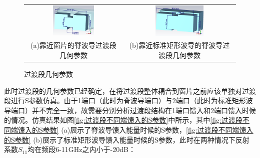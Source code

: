 \documentclass[master]{thesis-uestc}
\begin{document}
\begin{figure}[!htb]
    \small
    \centering
    \begin{tabular}{@{\ }c@{\ }c}
        \includegraphics[width=0.45\textwidth]{pic/chapter3/靠近窗片的脊波导过渡段.png} & 
        \hspace{5pt}
        \includegraphics[width=0.45\textwidth]{pic/chapter3/靠近标准矩形波导的脊波导过渡段.png}     \\
        \mbox{\small (a)靠近窗片的脊波导过渡段几何参数}                                                                               & 
        \mbox{\small (b)靠近标准矩形波导的脊波导过渡段几何参数}                                                                                  \\
    \end{tabular}
    \caption{过渡段几何参数}
    \label{fig:过渡段几何参数}
\end{figure}

此时过渡段的几何参数已经确定，在将过渡段整体耦合到窗片之前应该单独对过渡段进行S参数仿真。由于1端口（此时为脊波导端口）与2端口（此时为标准矩形波导端口）并不完全一致，故需要分别分析过渡段结构在1端口馈入和2端口馈入时候的情况。仿真结果如图\ref{fig:过渡段不同端馈入的S参数}中所示，其中\ref{fig:过渡段不同端馈入的S参数} (a)展示了脊波导馈入能量时候的S参数，\ref{fig:过渡段不同端馈入的S参数} (b)展示了标准矩形波导馈入能量时候的S参数，此时在两种情况下反射系数$S_{11}$均在频段6-11GHz之内小于-20dB：
\end{document}
